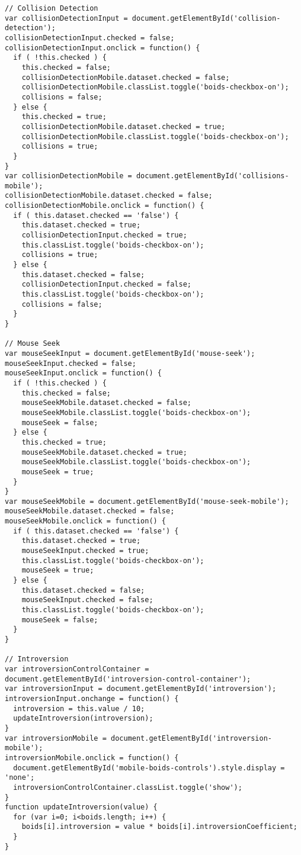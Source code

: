\begin{lstlisting}
// Collision Detection
var collisionDetectionInput = document.getElementById('collision-detection');
collisionDetectionInput.checked = false;
collisionDetectionInput.onclick = function() {
  if ( !this.checked ) {
    this.checked = false;
    collisionDetectionMobile.dataset.checked = false;
    collisionDetectionMobile.classList.toggle('boids-checkbox-on');
    collisions = false;
  } else {
    this.checked = true;
    collisionDetectionMobile.dataset.checked = true;
    collisionDetectionMobile.classList.toggle('boids-checkbox-on');
    collisions = true;
  }
}
var collisionDetectionMobile = document.getElementById('collisions-mobile');
collisionDetectionMobile.dataset.checked = false;
collisionDetectionMobile.onclick = function() {
  if ( this.dataset.checked == 'false') {
    this.dataset.checked = true;
    collisionDetectionInput.checked = true;
    this.classList.toggle('boids-checkbox-on');
    collisions = true;
  } else {
    this.dataset.checked = false;
    collisionDetectionInput.checked = false;
    this.classList.toggle('boids-checkbox-on');
    collisions = false;
  }
}

// Mouse Seek
var mouseSeekInput = document.getElementById('mouse-seek');
mouseSeekInput.checked = false;
mouseSeekInput.onclick = function() {
  if ( !this.checked ) {
    this.checked = false;
    mouseSeekMobile.dataset.checked = false;
    mouseSeekMobile.classList.toggle('boids-checkbox-on');
    mouseSeek = false;
  } else {
    this.checked = true;
    mouseSeekMobile.dataset.checked = true;
    mouseSeekMobile.classList.toggle('boids-checkbox-on');
    mouseSeek = true;
  }
}
var mouseSeekMobile = document.getElementById('mouse-seek-mobile');
mouseSeekMobile.dataset.checked = false;
mouseSeekMobile.onclick = function() {
  if ( this.dataset.checked == 'false') {
    this.dataset.checked = true;
    mouseSeekInput.checked = true;
    this.classList.toggle('boids-checkbox-on');
    mouseSeek = true;
  } else {
    this.dataset.checked = false;
    mouseSeekInput.checked = false;
    this.classList.toggle('boids-checkbox-on');
    mouseSeek = false;
  }
}

// Introversion
var introversionControlContainer = document.getElementById('introversion-control-container');
var introversionInput = document.getElementById('introversion');
introversionInput.onchange = function() {
  introversion = this.value / 10;
  updateIntroversion(introversion);
}
var introversionMobile = document.getElementById('introversion-mobile');
introversionMobile.onclick = function() {
  document.getElementById('mobile-boids-controls').style.display = 'none';
  introversionControlContainer.classList.toggle('show');
}
function updateIntroversion(value) {
  for (var i=0; i<boids.length; i++) {
    boids[i].introversion = value * boids[i].introversionCoefficient;
  }
}


\end{lstlisting}

